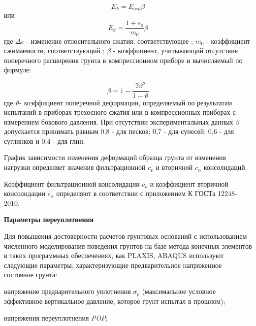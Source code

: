 \[
   E_k = E_{oed} \beta
\]
или
\[
   E_k = \frac{1+e_0}{m_0}\beta
\]
где $\Delta \epsilon$ - изменение относительного сжатия, соответствующее ;
$m_0$ - коэффициент сжимаемости, соответствующий ;
$\beta$ - коэффициент, учитывающий отсутствие поперечного расширения
грунта в компрессионном приборе и вычисляемый по формуле:

\[
   \beta = 1-\frac{2\vartheta^2}{1-\vartheta}
\]
где $\vartheta$- коэффициент поперечной деформации, определяемый по результатам
испытаний в приборах трехосного сжатия или в компрессионных
приборах с измерением бокового давления.
При отсутствии экспериментальных данных $\beta$ допускается принимать
равным 0,8 - для песков; 0,7 - для супесей; 0,6 - для суглинков и 0,4 - для глин.

График зависимости изменения деформаций образца грунта 
от изменения нагрузки определяет значения фильтрационной \textit{$c_\nu$} 
и вторичной \textit{$c_\alpha$} консолидаций.

Коэффициент фильтрационной консолидации \textit{$c_\nu$} и коэффициент
вторичной консолидации \textit{$c_\alpha$} определяют в соответствии 
с приложением К ГОСТа 12248-2010.

%
%
%

\textbf{Параметры переуплотнения}

Для повышения достоверности расчетов грунтовых оснований 
с использованием численного моделирования поведения 
грунтов на базе метода конечных элементов в таких программных
обеспечениях, как PLAXIS, ABAQUS используют следующие 
параметры, характеризующие предварительное напряженное 
состояние грунта:

напряжение предварительного уплотнения $\sigma_p$ 
(максимальное условное эффективное вертикальное давление, 
которое грунт испытал в прошлом);

напряжения переуплотнения \textit{POP};

